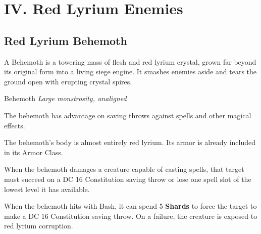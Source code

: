 \section{IV. Red Lyrium Enemies}
\label{app:lyrium}

\subsection{Red Lyrium Behemoth}

A Behemoth is a towering mass of flesh and red lyrium crystal, grown far beyond its original form into a living siege engine. It smashes enemies aside and tears the ground open with erupting crystal spires.

\begin{monsterbox}{Behemoth}
\textit{Large monstrosity, unaligned}\\
\rpghline
\basics[
  armorclass = 10 (lyrium hide),
  hitpoints = 120,
  speed = 35 ft.
]
\rpghline
\stats[
  STR = \stat{26},
  DEX = \stat{10},
  CON = \stat{26},
  INT = \stat{8},
  WIS = \stat{12},
  CHA = \stat{8}
]
\rpghline
\details[
  skills = Athletics +10,
  senses = passive Perception 11,
  languages = understands Common but can't speak,
  challenge = 10
]
\rpghline

\begin{rpg-monsteraction}
The behemoth has advantage on saving throws against spells and other magical effects.
\end{rpg-monsteraction}

\begin{rpg-monsteraction}
The behemoth's body is almost entirely red lyrium. Its armor is already included in its Armor Class.
\end{rpg-monsteraction}

\begin{rpg-monsteraction}
When the behemoth damages a creature capable of casting spells, that target must succeed on a DC 16 Constitution saving throw or lose one spell slot of the lowest level it has available.
\end{rpg-monsteraction}

\begin{rpg-monsteraction}
When the behemoth hits with Bash, it can spend 5 \textbf{Shards} to force the target to make a DC 16 Constitution saving throw. On a failure, the creature is exposed to red lyrium corruption.
\end{rpg-monsteraction}


\end{monsterbox}

